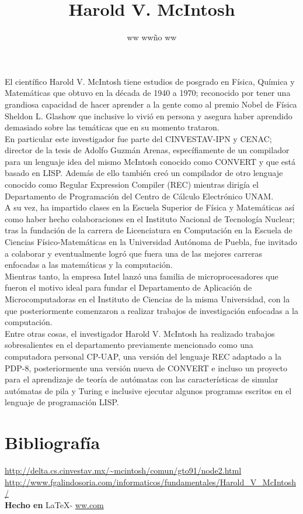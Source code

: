 \documentclass{article}
\title{Harold V. McIntosh}
\author{ww ww\~no ww}
\date{} %
\begin{document}
	\maketitle
	\normalsize{
El científico Harold V. McIntosh tiene estudios de posgrado en Física, Química y Matemáticas que obtuvo en la década de 1940 a 1970; reconocido por tener una grandiosa capacidad de hacer aprender a la gente como al premio Nobel de Física Sheldon L. Glashow que inclusive lo vivió en persona y asegura haber aprendido demasiado sobre las temáticas que en su momento trataron.
\\

En particular este investigador fue parte del CINVESTAV-IPN y CENAC; director de la tesis de Adolfo Guzmán Arenas, específiamente de un compilador para un lenguaje idea del mismo McIntosh conocido como CONVERT y que está basado en LISP. Además de ello también creó un compilador de otro lenguaje conocido como Regular Expression Compiler (REC) mientras dirigía el Departamento de Programación del Centro de Cálculo Electrónico UNAM.
\\

A su vez, ha impartido clases en la Escuela Superior de Física y Matemáticas así como haber hecho colaboraciones en el Instituto Nacional de Tecnología Nuclear; tras la fundación de la carrera de Licenciatura en Computación en la Escuela de Ciencias Físico-Matemáticas en la Universidad Autónoma de Puebla, fue invitado a colaborar y eventualmente logró que fuera una de las mejores carreras enfocadas a las matemáticas y la computación.
\\

Mientras tanto, la empresa Intel lanzó una familia de microprocesadores que fueron el motivo ideal para fundar el Departamento de Aplicación de Microcomputadoras en el Instituto de Ciencias de la misma Universidad, con la que posteriormente comenzaron a realizar trabajos de investigación enfocadas a la computación.
\\

Entre otras cosas, el investigador Harold V. McIntosh ha realizado trabajos sobresalientes en el departamento previamente mencionado como una computadora personal CP-UAP, una versión del lenguaje REC adaptado a la PDP-8, posteriormente una versión nueva de CONVERT e incluso un proyecto para el aprendizaje de teoría de autómatas con las características de simular autómatas de pila y Turing e inclusive ejecutar algunos programas escritos en el lenguaje de programación LISP.
}

\vspace{1cm}

\section*{Bibliograf\'ia}

\noindent \url{http://delta.cs.cinvestav.mx/~mcintosh/comun/gto91/node2.html}
\\
\noindent \url{http://www.fgalindosoria.com/informaticos/fundamentales/Harold_V_McIntosh/}
\\

\large{\hfill \textbf{Hecho en } \LaTeX - \url{ww.com}}
\end{document}

